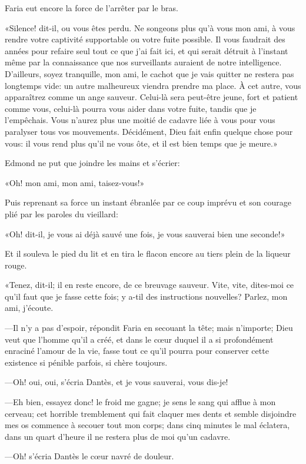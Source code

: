 Faria eut encore la force de l'arrêter par le bras.

«Silence! dit-il, ou vous êtes perdu. Ne songeons plus qu'à vous mon ami, à vous rendre votre captivité supportable ou votre fuite possible. Il vous faudrait des années pour refaire seul tout ce que j'ai fait ici, et qui serait détruit à l'instant même par la connaissance que nos surveillants auraient de notre intelligence. D'ailleurs, soyez tranquille, mon ami, le cachot que je vais quitter ne restera pas longtemps vide: un autre malheureux viendra prendre ma place. À cet autre, vous apparaîtrez comme un ange sauveur. Celui-là sera peut-être jeune, fort et patient comme vous, celui-là pourra vous aider dans votre fuite, tandis que je l'empêchais. Vous n'aurez plus une moitié de cadavre liée à vous pour vous paralyser tous vos mouvements. Décidément, Dieu fait enfin quelque chose pour vous: il vous rend plus qu'il ne vous ôte, et il est bien temps que je meure.»

Edmond ne put que joindre les mains et s'écrier:

«Oh! mon ami, mon ami, taisez-vous!»

Puis reprenant sa force un instant ébranlée par ce coup imprévu et son courage plié par les paroles du vieillard:

«Oh! dit-il, je vous ai déjà sauvé une fois, je vous sauverai bien une seconde!»

Et il souleva le pied du lit et en tira le flacon encore au tiers plein de la liqueur rouge.

«Tenez, dit-il; il en reste encore, de ce breuvage sauveur. Vite, vite, dites-moi ce qu'il faut que je fasse cette fois; y a-til des instructions nouvelles? Parlez, mon ami, j'écoute.

—Il n'y a pas d'espoir, répondit Faria en secouant la tête; mais n'importe; Dieu veut que l'homme qu'il a créé, et dans le cœur duquel il a si profondément enraciné l'amour de la vie, fasse tout ce qu'il pourra pour conserver cette existence si pénible parfois, si chère toujours.

—Oh! oui, oui, s'écria Dantès, et je vous sauverai, vous dis-je!

—Eh bien, essayez donc! le froid me gagne; je sens le sang qui afflue à mon cerveau; cet horrible tremblement qui fait claquer mes dents et semble disjoindre mes os commence à secouer tout mon corps; dans cinq minutes le mal éclatera, dans un quart d'heure il ne restera plus de moi qu'un cadavre.

—Oh! s'écria Dantès le cœur navré de douleur.

